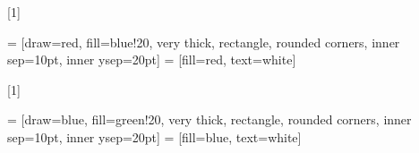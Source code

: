 \newcommand{\mat}[1]{\mathbf{#1}}
\let\oldvec\vec
\renewcommand{\vec}[1]{\mathbf{#1}}

\newcommand{\trs}[1]{#1^\mathrm{T}}





[1]
{
  
   = [draw=red, fill=blue!20, very thick, rectangle, rounded corners, inner sep=10pt, inner ysep=20pt]
   = [fill=red, text=white]
}

[1]
{
  
   = [draw=blue, fill=green!20, very thick, rectangle, rounded corners, inner sep=10pt, inner ysep=20pt]
   = [fill=blue, text=white]
}



